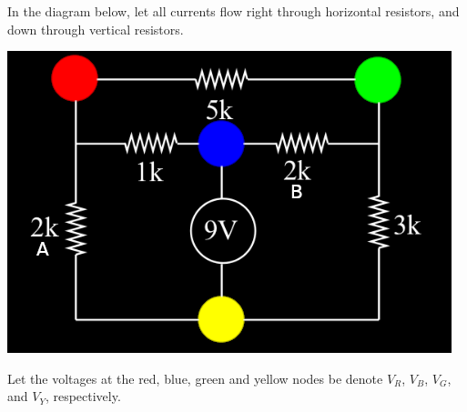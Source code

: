 \documentclass{article}
\begin{document}
\bigskip
{}

In the diagram below, let all currents flow right through horizontal resistors, and down through vertical resistors.
\begin{center}
    \includegraphics[scale=.65]{circuit.png}
\end{center}

Let the voltages at the red, blue, green and yellow nodes be denote $V_R$, $V_B$, $V_G$, and $V_Y$, respectively.
\begin{align*}
\end{align*}
\end{document}
